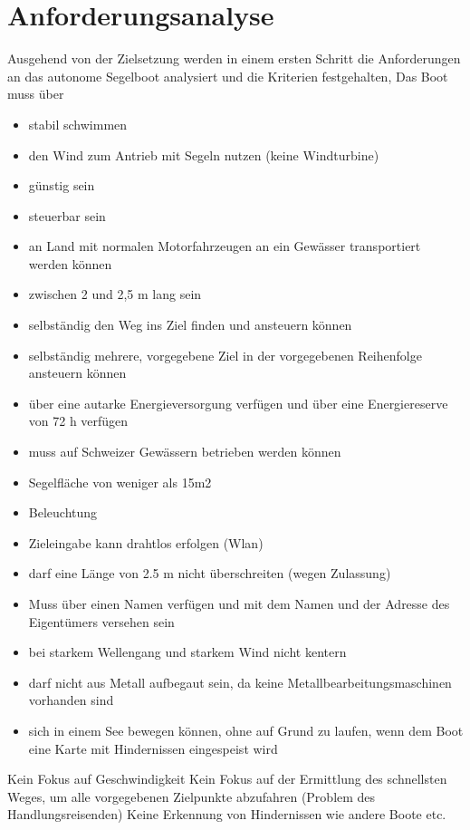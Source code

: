 \section{Anforderungsanalyse}
Ausgehend von der Zielsetzung werden in einem ersten Schritt die Anforderungen an das autonome Segelboot analysiert und die Kriterien festgehalten, Das Boot muss über
\begin{itemize}
    \item stabil schwimmen
    \item den Wind zum Antrieb mit Segeln nutzen (keine Windturbine)
    \item günstig sein
    \item steuerbar sein
    \item an Land mit normalen Motorfahrzeugen an ein Gewässer transportiert werden können
    \item zwischen 2 und 2,5 m lang sein
    \item selbständig den Weg ins Ziel finden und ansteuern können
    \item selbständig mehrere, vorgegebene Ziel in der vorgegebenen Reihenfolge ansteuern können
    \item über eine autarke Energieversorgung verfügen und über eine Energiereserve von 72 h verfügen 
    \item muss auf Schweizer Gewässern betrieben werden können 
    \item Segelfläche von weniger als 15m2
    \item Beleuchtung
    \item Zieleingabe kann drahtlos erfolgen (Wlan)
    \item darf eine Länge von 2.5 m nicht überschreiten (wegen Zulassung)
    \item Muss über einen Namen verfügen und mit dem Namen und der Adresse des Eigentümers versehen sein 
    \item bei starkem Wellengang und starkem Wind nicht kentern
    \item darf nicht aus Metall aufbegaut sein, da keine Metallbearbeitungsmaschinen vorhanden sind
    \item sich in einem See bewegen können, ohne auf Grund zu laufen, wenn dem Boot eine Karte mit Hindernissen eingespeist wird
\end{itemize}

Kein Fokus auf Geschwindigkeit
Kein Fokus auf der Ermittlung des schnellsten Weges, um alle vorgegebenen Zielpunkte abzufahren (Problem des Handlungsreisenden)
Keine Erkennung von Hindernissen wie andere Boote etc.
 

